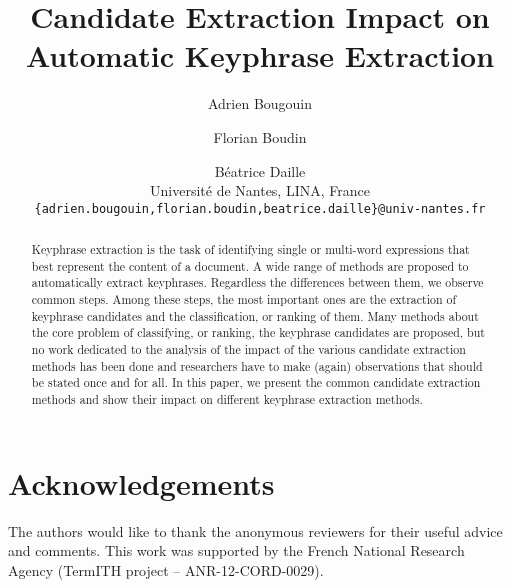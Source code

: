 \documentclass[11pt]{article}
\title{Candidate Extraction Impact on Automatic Keyphrase Extraction}
\author{
  Adrien Bougouin \and Florian Boudin \and Béatrice Daille\\
  Université de Nantes, LINA, France\\
  {\tt \{adrien.bougouin,florian.boudin,beatrice.daille\}@univ-nantes.fr}
}
\date{}
\begin{document}
  \maketitle
  \begin{abstract}
    Keyphrase extraction is the task of identifying single or multi-word
    expressions that best represent the content of a document. A wide range of
    methods are proposed to automatically extract keyphrases. Regardless the
    differences between them, we observe common steps. Among these steps, the
    most important ones are the extraction of keyphrase candidates and the
    classification, or ranking of them. Many methods about the core problem of
    classifying, or ranking, the keyphrase candidates are proposed, but no work
    dedicated to the analysis of the impact of the various candidate extraction
    methods has been done and researchers have to make (again) observations that
    should be stated once and for all. In this paper, we present the common
    candidate extraction methods and show their impact on different keyphrase
    extraction methods.%
  \end{abstract}

  

  \section*{Acknowledgements}
  The authors would like to thank the anonymous reviewers for their useful
  advice and comments. This work was supported by the French National Research
  Agency (TermITH project -- ANR-12-CORD-0029).

  
  
\end{document}
